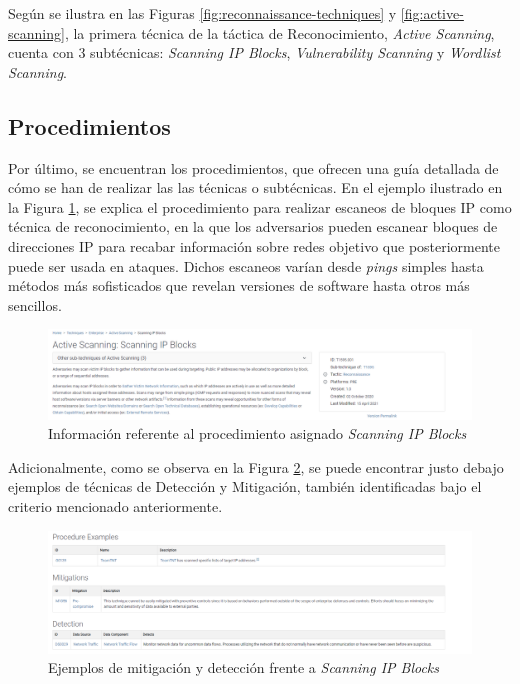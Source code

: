 Según se ilustra en las Figuras \ref{fig:reconnaissance-techniques} y \ref{fig:active-scanning}, la primera técnica de la táctica de Reconocimiento, \textit{Active Scanning}, cuenta con 3 subtécnicas: \textit{Scanning IP Blocks}, \textit{Vulnerability Scanning} y \textit{Wordlist Scanning}.


\subsection{Procedimientos}

Por último, se encuentran los procedimientos, que ofrecen una guía detallada de cómo se han de realizar las las técnicas o subtécnicas. En el ejemplo ilustrado en la Figura \ref{fig:ejemplo-procedimiento}, se explica el procedimiento para realizar escaneos de bloques \gls{IP} como técnica de reconocimiento, en la que los adversarios pueden escanear bloques de direcciones \gls{IP} para recabar información sobre redes objetivo que posteriormente puede ser usada en ataques. Dichos escaneos varían desde \textit{pings} simples hasta métodos más sofisticados que revelan versiones de software hasta otros más sencillos.


\begin{figure}[H]
    \centering
    \includegraphics[width=1\linewidth]{imagenes/17.png}
    \caption{Información referente al procedimiento asignado \textit{Scanning \gls{IP}  Blocks} \cite{mitre_attack}}
    \label{fig:ejemplo-procedimiento}
\end{figure}

Adicionalmente, como se observa en la Figura \ref{fig:ejemplo-procedimiento-2}, se puede encontrar justo debajo ejemplos de técnicas de Detección y Mitigación, también identificadas bajo el criterio mencionado anteriormente.

\begin{figure}[H]
    \centering
    \includegraphics[width=1\linewidth]{imagenes/18.png}
    \caption{Ejemplos de mitigación y detección frente a \textit{Scanning \gls{IP} Blocks} \cite{mitre_attack}}
    \label{fig:ejemplo-procedimiento-2}
\end{figure}

